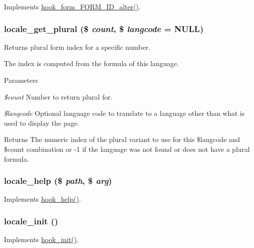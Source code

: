 \label{locale_8module_aa97391a9803f665e0c9be02ce4d3b5dd}
Implements \hyperlink{group__hooks_ga8d4a4089551493d55911bd5c4f218264}{hook\_\-form\_\-FORM\_\-ID\_\-alter()}. \hypertarget{locale_8module_a927bf27452f39ef88eca329f10f92761}{
\subsubsection[{locale\_\-get\_\-plural}]{\setlength{\rightskip}{0pt plus 5cm}locale\_\-get\_\-plural (\$ {\em count}, \/  \$ {\em langcode} = {\ttfamily NULL})}}
\label{locale_8module_a927bf27452f39ef88eca329f10f92761}
Returns plural form index for a specific number.

The index is computed from the formula of this language.


\begin{DoxyParams}{Parameters}
\item[{\em \$count}]Number to return plural for. \item[{\em \$langcode}]Optional language code to translate to a language other than what is used to display the page.\end{DoxyParams}
\begin{DoxyReturn}{Returns}
The numeric index of the plural variant to use for this \$langcode and \$count combination or -\/1 if the language was not found or does not have a plural formula. 
\end{DoxyReturn}
\hypertarget{locale_8module_ad8e900fa401bc78167a99d13f88ea797}{
\subsubsection[{locale\_\-help}]{\setlength{\rightskip}{0pt plus 5cm}locale\_\-help (\$ {\em path}, \/  \$ {\em arg})}}
\label{locale_8module_ad8e900fa401bc78167a99d13f88ea797}
Implements \hyperlink{group__hooks_ga5589c2714a782738e8851c4c90231f0e}{hook\_\-help()}. \hypertarget{locale_8module_a93f28627ee01c5add57a18b298e23124}{
\subsubsection[{locale\_\-init}]{\setlength{\rightskip}{0pt plus 5cm}locale\_\-init ()}}
\label{locale_8module_a93f28627ee01c5add57a18b298e23124}
Implements \hyperlink{group__hooks_ga74edef0c463436fdbb1f92ef367db051}{hook\_\-init()}.

